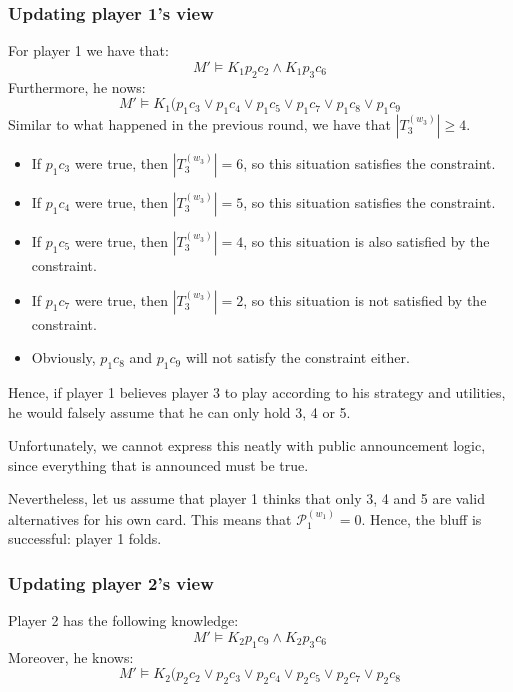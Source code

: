 \documentclass[a4paper,10pt]{article}
\begin{document}
\subsubsection{Updating player 1's view}
For player 1 we have that:
\begin{equation}
 M'\models K_1 p_2 c_2 \wedge K_1 p_3 c_6
\end{equation}
Furthermore, he nows:
\begin{equation*}
M'\models K_1(p_1 c_3 \vee p_1 c_4 \vee p_1 c_5 \vee p_1 c_7 \vee p_1 c_8 \vee p_1 c_9
\end{equation*}
Similar to what happened in the previous round, we have that $|T_3^{(w_3)}| \geq 4$.
\begin{itemize}
 \item If $p_1 c_3$ were true, then $|T_3^{(w_3)}| = 6$, so this situation satisfies the constraint.
 \item If $p_1 c_4$ were true, then $|T_3^{(w_3)}| = 5$, so this situation satisfies the constraint.
 \item If $p_1 c_5$ were true, then $|T_3^{(w_3)}| = 4$, so this situation is also satisfied by the constraint.
 \item If $p_1 c_7$ were true, then $|T_3^{(w_3)}| = 2$, so this situation is not satisfied by the constraint.
 \item Obviously, $p_1 c_8$ and $p_1 c_9$ will not satisfy the constraint either. 
\end{itemize}
Hence, if player 1 believes player 3 to play according to his strategy and utilities, he would falsely assume that he can only hold 3, 4 or 5.

Unfortunately, we cannot express this neatly with public announcement logic, since everything that is announced must be true.

Nevertheless, let us assume that player 1 thinks that only 3, 4 and 5 are valid alternatives for his own card. This means that $\mathcal{P}^{(w_1)}_1 = 0$. Hence, the bluff is successful: player 1 folds.

\subsubsection{Updating player 2's view}
Player 2 has the following knowledge:
\begin{equation*}
 M'\models K_2 p_1 c_9 \wedge K_2 p_3 c_6
\end{equation*}
Moreover, he knows:
\begin{equation*}
M'\models K_2(p_2 c_2 \vee p_2 c_3 \vee p_2 c_4 \vee p_2 c_5 \vee p_2 c_7 \vee p_2 c_8
\end{equation*}
\end{document}
